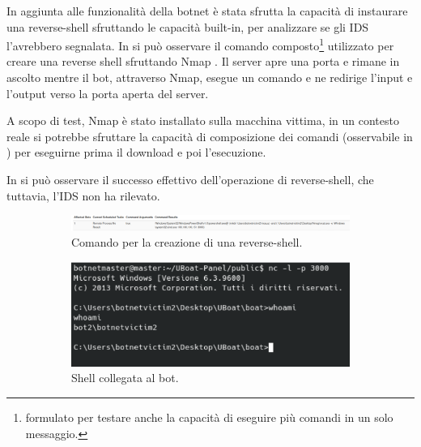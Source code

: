 \medskip
In aggiunta alle funzionalità della botnet è stata sfrutta la capacità di instaurare una reverse-shell sfruttando le capacità built-in, per analizzare se gli IDS l'avrebbero segnalata.
In  si può osservare il comando composto\footnote{formulato per testare anche la capacità di eseguire più comandi in un solo messaggio.} utilizzato per creare una reverse shell sfruttando Nmap \cite{nmap}. Il server apre una porta e rimane in ascolto mentre il bot, attraverso Nmap,  esegue un comando e ne redirige l'input e l'output verso la porta aperta del server.

A scopo di test, Nmap è stato installato sulla macchina vittima, in un contesto reale si potrebbe sfruttare la capacità di composizione dei comandi (osservabile in ) per eseguirne prima il download e poi l'esecuzione.

In  si può osservare il successo effettivo dell'operazione di reverse-shell, che tuttavia, l'IDS non ha rilevato.

\begin{figure}
    \centering
    \begin{subfigure}{0.4\textwidth}
    \centering
    \includegraphics[width=\textwidth]{res/fig/reverse-shell1.png}
    \caption{Comando per la creazione di una reverse-shell.}
    \label{fig:uboat-reverseshell1}
    \end{subfigure}
    \hfill
    \begin{subfigure}{0.4\textwidth}
    \centering
    \includegraphics[width=\textwidth]{res/fig/reverse-shell2.png}
    \caption{Shell collegata al bot.}
    \label{fig:uboat-reverseshell2}
    \end{subfigure}
    \caption{}
    \label{fif:uboat-reverseshell}
\end{figure}

